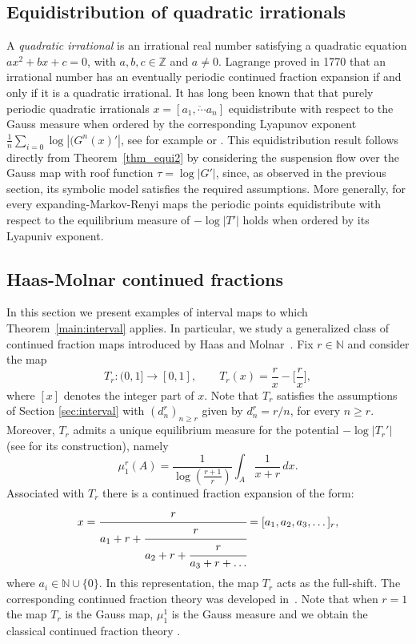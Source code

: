 \documentclass[letterpaper,11pt]{amsart}
\numberwithin{equation}{section}     %
\newcommand{\Z}{\mathbb{Z}}
\newcommand{\N}{\mathbb{N}}
\def\N{{\mathbb N}}
\def\Z{{\mathbb Z}}
\def\ge{\geqslant}
\begin{document}
\subsection{Equidistribution of quadratic irrationals} 
A \emph{quadratic irrational} is an irrational real number satisfying a quadratic equation $ax^2+bx+c=0$, with $a,b,c \in \Z$ and $a \neq 0$.  Lagrange proved in 1770 that an irrational number has an eventually periodic continued fraction expansion if and only if it is a quadratic
irrational.
It has long been known that that purely periodic quadratic irrationals $x=[\overline{a_1, \dotsm a_n}]$ equidistribute with respect to the Gauss measure when ordered by the corresponding Lyapunov exponent $\frac{1}{n}\sum_{i=0} \log|(G^n(x)'|$, see for example \cite[Section 5]{p1} or \cite[Section 8]{m}. This equidistribution result follows directly from Theorem~\ref{thm_equi2} by considering the suspension flow over the Gauss map with roof function $\tau=\log |G'|$, since, as observed in the previous section, its symbolic model satisfies the required assumptions. More generally, for every expanding-Markov-Renyi maps the  periodic points equidistribute  with respect to the equilibrium measure of $-\log|T'|$ holds when ordered by its Lyapuniv exponent.

\subsection{Haas-Molnar continued fractions} \label{sec:examples} 
In this section we present examples of interval maps to which Theorem~\ref{main:interval} applies. In particular, we study a generalized class of continued fraction maps introduced by Haas and Molnar~\cite{hm}. Fix $r \in \N$ and consider the map
\[
T_r \colon (0,1] \to [0,1], \qquad
T_r(x) = \frac{r}{x} - \Big[ \frac{r}{x} \Big],
\]
where $[ x ]$ denotes the integer part of $x$. Note that $T_r$ satisfies the assumptions of Section \ref{sec:interval} with  $(d_n^r)_{n\ge r}$ given by $d_n^r =r/n$, for every $n \geq r$. Moreover,  $T_r$ admits a unique equilibrium measure for the potential $-\log |T_r'|$  (see \cite{hm} for its construction), namely
\[
\mu_1^r(A)
=
\frac{1}{\log\!\left(\frac{r+1}{r}\right)}
\int_A \frac{1}{x+r}\, dx .
\]
Associated with $T_r$ there is a continued fraction expansion of the form:
\[
x
=
\cfrac{r}{a_1 + r + \cfrac{r}{a_2 +r + \cfrac{r}{a_3 + r + \dots}}}
=
[a_1,a_2,a_3,\dots]_r,
\]
where $a_i \in \mathbb{N} \cup \{0\}$. In this representation, the map $T_r$ acts as the full-shift. The corresponding continued fraction theory was developed in~\cite{hm}. Note that when $r=1$ the map $T_r$ is the Gauss map, $\mu_1^1$  is the Gauss measure  and we obtain the classical continued fraction theory \cite{hw,ki}.
\end{document}
